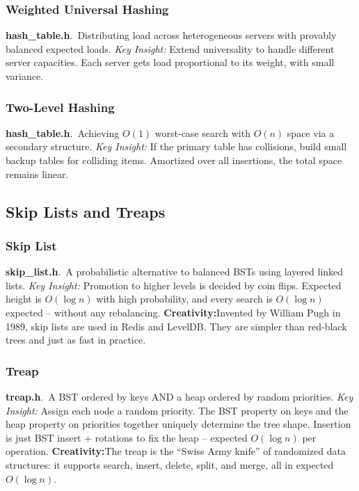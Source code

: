 \documentclass[11pt,a4paper]{article}
\newcommand{\algo}[2]{\textbf{#1}.\ #2}
\newcommand{\insight}{\textit{Key Insight: }}
\newcommand{\creative}{\textcolor{orange!80!black}{\textbf{Creativity:}}}
\begin{document}
\subsubsection{Weighted Universal Hashing}
\algo{hash\_table.h}{Distributing load across heterogeneous servers with provably balanced expected loads.}
\insight Extend universality to handle different server capacities. Each server gets load proportional to its weight, with small variance.

\subsubsection{Two-Level Hashing}
\algo{hash\_table.h}{Achieving \(O(1)\) worst-case search with \(O(n)\) space via a secondary structure.}
\insight If the primary table has collisions, build small backup tables for colliding items. Amortized over all insertions, the total space remains linear.

\subsection{Skip Lists and Treaps}

\subsubsection{Skip List}
\algo{skip\_list.h}{A probabilistic alternative to balanced BSTs using layered linked lists.}
\insight Promotion to higher levels is decided by coin flips. Expected height is \(O(\log n)\) with high probability, and every search is \(O(\log n)\) expected -- without any rebalancing.
\creative Invented by William Pugh in 1989, skip lists are used in Redis and LevelDB. They are simpler than red-black trees and just as fast in practice.

\subsubsection{Treap}
\algo{treap.h}{A BST ordered by keys AND a heap ordered by random priorities.}
\insight Assign each node a random priority. The BST property on keys and the heap property on priorities together uniquely determine the tree shape. Insertion is just BST insert + rotations to fix the heap -- expected \(O(\log n)\) per operation.
\creative The treap is the ``Swiss Army knife'' of randomized data structures: it supports search, insert, delete, split, and merge, all in expected \(O(\log n)\).
\end{document}
